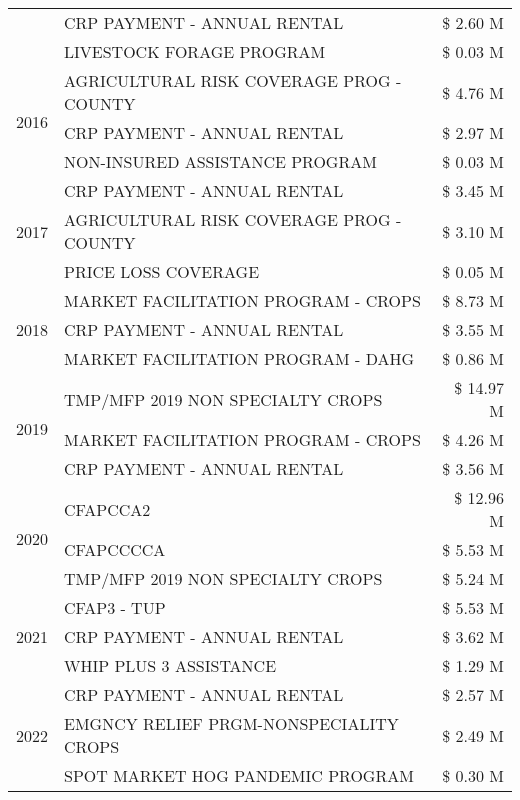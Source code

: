 \begin{tabular}{llr}
 & CRP PAYMENT - ANNUAL RENTAL & \$ 2.60 M \\
 & LIVESTOCK FORAGE PROGRAM & \$ 0.03 M \\
\cline{1-3}
\multirow[t]{3}{*}{2016} & AGRICULTURAL RISK COVERAGE PROG - COUNTY & \$ 4.76 M \\
 & CRP PAYMENT - ANNUAL RENTAL & \$ 2.97 M \\
 & NON-INSURED ASSISTANCE PROGRAM & \$ 0.03 M \\
\cline{1-3}
\multirow[t]{3}{*}{2017} & CRP PAYMENT - ANNUAL RENTAL & \$ 3.45 M \\
 & AGRICULTURAL RISK COVERAGE PROG - COUNTY & \$ 3.10 M \\
 & PRICE LOSS COVERAGE & \$ 0.05 M \\
\cline{1-3}
\multirow[t]{3}{*}{2018} & MARKET FACILITATION PROGRAM - CROPS & \$ 8.73 M \\
 & CRP PAYMENT - ANNUAL RENTAL & \$ 3.55 M \\
 & MARKET FACILITATION PROGRAM - DAHG & \$ 0.86 M \\
\cline{1-3}
\multirow[t]{3}{*}{2019} & TMP/MFP 2019 NON SPECIALTY CROPS & \$ 14.97 M \\
 & MARKET FACILITATION PROGRAM - CROPS & \$ 4.26 M \\
 & CRP PAYMENT - ANNUAL RENTAL & \$ 3.56 M \\
\cline{1-3}
\multirow[t]{3}{*}{2020} & CFAPCCA2 & \$ 12.96 M \\
 & CFAPCCCCA & \$ 5.53 M \\
 & TMP/MFP 2019 NON SPECIALTY CROPS & \$ 5.24 M \\
\cline{1-3}
\multirow[t]{3}{*}{2021} & CFAP3 - TUP & \$ 5.53 M \\
 & CRP PAYMENT - ANNUAL RENTAL & \$ 3.62 M \\
 & WHIP PLUS 3 ASSISTANCE & \$ 1.29 M \\
\cline{1-3}
\multirow[t]{3}{*}{2022} & CRP PAYMENT - ANNUAL RENTAL & \$ 2.57 M \\
 & EMGNCY RELIEF PRGM-NONSPECIALITY CROPS & \$ 2.49 M \\
 & SPOT MARKET HOG PANDEMIC PROGRAM & \$ 0.30 M \\
\cline{1-3}
\bottomrule
\end{tabular}
